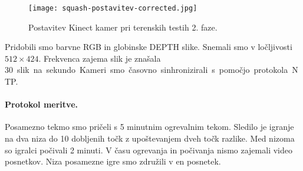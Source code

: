 \begin{figure}[!htb]
	\centering
	\texttt{[image: squash-postavitev-corrected.jpg]}	
	\caption[Postavitev kamer Kinect V2 pri terenskih testih 2. faze]{Postavitev Kinect kamer pri terenskih testih 2. faze.}
	\label{fig:field-postavitev-kamer}
\end{figure}


Pridobili smo barvne RGB in globinske DEPTH slike. Snemali smo v ločljivosti $512 \times 424$. Frekvenca zajema slik je znašala \SI{30} slik na sekundo. Kameri smo časovno sinhronizirali s pomočjo protokola NTP.



\paragraph{Protokol meritve.}
Posamezno tekmo smo pričeli s 5 minutnim ogrevalnim tekom. Sledilo je igranje na dva niza do 10 dobljenih točk z upoštevanjem dveh točk razlike. Med nizoma so igralci počivali 2 minuti. V času ogrevanja in počivanja nismo zajemali video posnetkov. Niza posamezne igre smo združili v en posnetek.

